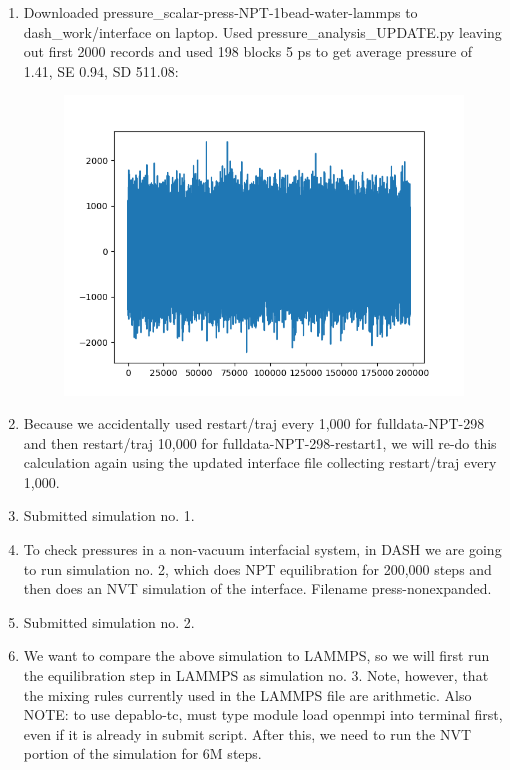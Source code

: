 \documentclass[12pt,reqno]{amsart}
\numberwithin{equation}{section}
\begin{document}
\begin{enumerate}
\item Downloaded pressure\_scalar-press-NPT-1bead-water-lammps to dash\_work/interface on laptop.  Used pressure\_analysis\_UPDATE.py leaving out first 2000 records and used 198 blocks 5 ps to get average pressure of 1.41, SE 0.94, SD 511.08: 
\begin{figure}[H]
\centering
\includegraphics[scale=0.4]{pressures_press-NPT-1bead-water-lammps}
\end{figure}
\item Because we accidentally used restart/traj every 1,000 for fulldata-NPT-298 and then restart/traj 10,000 for fulldata-NPT-298-restart1, we will re-do this calculation again using the updated interface file collecting restart/traj every 1,000.  
\item Submitted simulation no. 1.  
\item To check pressures in a non-vacuum interfacial system, in DASH we are going to run simulation no. 2, which does NPT equilibration for 200,000 steps and then does an NVT simulation of the interface.  Filename press-nonexpanded.
\item Submitted simulation no. 2.  
\item We want to compare the above simulation to LAMMPS, so we will first run the equilibration step in LAMMPS as simulation no. 3.  Note, however, that the mixing rules currently used in the LAMMPS file are arithmetic.  Also NOTE: to use depablo-tc, must type module load openmpi into terminal first, even if it is already in submit script.  After this, we need to run the NVT portion of the simulation for 6M steps.  

\end{enumerate}
\end{document}
